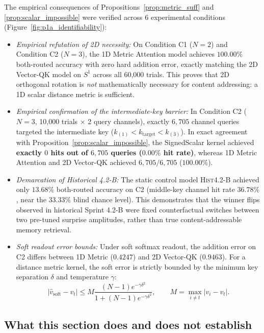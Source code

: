 The empirical consequences of Propositions~\ref{prop:metric_suff} and \ref{prop:scalar_impossible} were verified across 6 experimental conditions (Figure~\ref{fig:p1a_identifiability}):
\begin{itemize}
\item \emph{Empirical refutation of 2D necessity:} On Condition C1 ($N=2$) and Condition C2 ($N=3$), the 1D Metric Attention model achieves $100.00\%$ both-routed accuracy with zero hard addition error, exactly matching the 2D Vector-QK model on $S^1$ across all 60,000 trials. This proves that 2D orthogonal rotation is \emph{not} mathematically necessary for content addressing: a 1D scalar distance metric is sufficient.
\item \emph{Empirical confirmation of the intermediate-key barrier:} In Condition C2 ($N=3$, 10,000 trials $\times$ 2 query channels), exactly $6{,}705$ channel queries targeted the intermediate key ($k_{(1)} < k_{\text{target}} < k_{(3)}$). In exact agreement with Proposition~\ref{prop:scalar_impossible}, the SignedScalar kernel achieved \textbf{exactly $0$ hits out of $6{,}705$ queries ($0.00\%$ hit rate)}, whereas 1D Metric Attention and 2D Vector-QK achieved $6{,}705/6{,}705$ ($100.00\%$).
\item \emph{Demarcation of Historical 4.2-B:} The static control model \textsc{Hist4.2-B} achieved only $13.68\%$ both-routed accuracy on C2 (middle-key channel hit rate $36.78\%$, near the $33.33\%$ blind chance level). This demonstrates that the winner flips observed in historical Sprint 4.2-B were fixed counterfactual switches between two pre-tuned surprise amplitudes, rather than true content-addressable memory retrieval.
\item \emph{Soft readout error bounds:} Under soft softmax readout, the addition error on C2 differs between 1D Metric ($0.4247$) and 2D Vector-QK ($0.9463$). For a distance metric kernel, the soft error is strictly bounded by the minimum key separation $\delta$ and temperature $\gamma$:
\begin{equation}
|\hat{v}_{\mathrm{soft}} - v_t| \le M \frac{(N-1)e^{-\gamma\delta^2}}{1 + (N-1)e^{-\gamma\delta^2}}, \qquad M = \max_{i\ne t}|v_i - v_t|.
\end{equation}
\end{itemize}

\subsection{What this section does and does not establish}
\label{sec:scope5}

